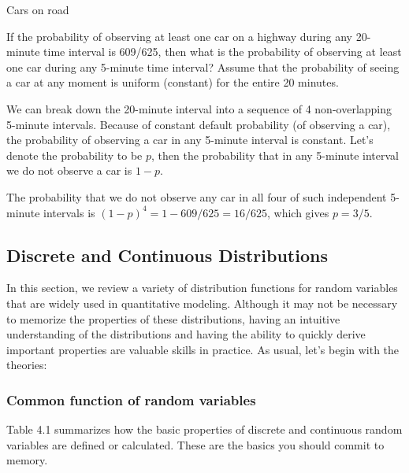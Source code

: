 \begin{problem}{Cars on road}

If the probability of observing at least one car on a highway during any 20-minute time interval is 609/625, then what is the probability of observing at least one car during any 5-minute time interval? Assume that the probability of seeing a car at any moment is uniform (constant) for the entire 20 minutes.

\end{problem}
\begin{solution}
We can break down the 20-minute interval into a sequence of 4 non-overlapping 5-minute intervals. Because of constant default probability (of observing a car), the probability of observing a car in any 5-minute interval is constant. Let's denote the probability to be \(p\), then the probability that in any 5-minute interval we do not observe a car is \(1-p\).

The probability that we do not observe any car in all four of such independent 5-minute intervals is \((1-p)^4=1-609/625=16/625\), which gives \(p=3/5\).
\end{solution}

\subsection{Discrete and Continuous Distributions}

In this section, we review a variety of distribution functions for random variables that are widely used in quantitative modeling. Although it may not be necessary to memorize the properties of these distributions, having an intuitive understanding of the distributions and having the ability to quickly derive important properties are valuable skills in practice. As usual, let's begin with the theories:

\subsubsection{Common function of random variables}

Table 4.1 summarizes how the basic properties of discrete and continuous random variables are defined or calculated. These are the basics you should commit to memory.

